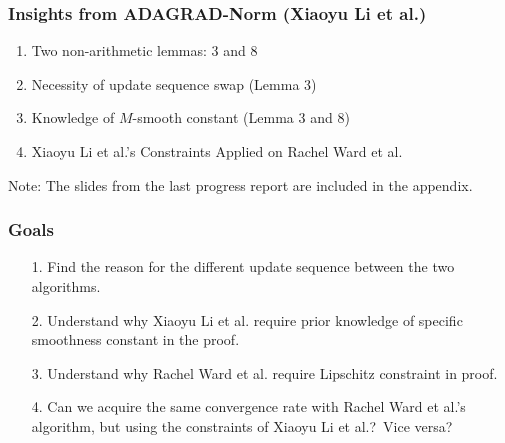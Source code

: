 \documentclass{beamer}
\begin{document}
\begin{frame}
\frametitle{Insights from ADAGRAD-Norm (Xiaoyu Li et al.)}
\begin{enumerate}
    \item Two non-arithmetic lemmas: 3 and 8
    \item Necessity of update sequence swap (Lemma 3)
    \item Knowledge of $M$-smooth constant (Lemma 3 and 8)
    \item Xiaoyu Li et al.’s Constraints Applied
on Rachel Ward et al.
\end{enumerate}\par\vspace{3mm}
Note: The slides from the last progress report are included in the appendix.
\end{frame}

\begin{frame}
\frametitle{Goals}
\begin{enumerate}
        \color{gray}\item [1.] Find the reason for the different update sequence between the two algorithms.
        \item [2.] Understand why Xiaoyu Li et al. require prior knowledge of specific smoothness constant in the proof.
        \color{black}\item [3.] Understand why Rachel Ward et al. require Lipschitz constraint in proof.
        \item [4.] \color{gray}Can we acquire the same convergence rate with Rachel Ward et al.'s algorithm, but using the constraints of Xiaoyu Li et al.?\color{black}\ Vice versa?
\end{enumerate}
\end{frame}
\end{document}
